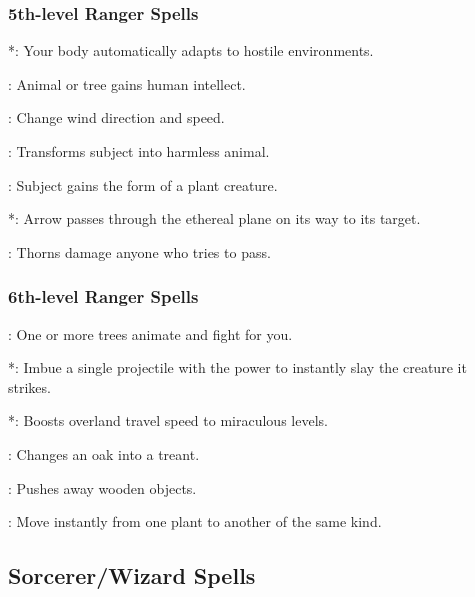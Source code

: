 \subsubsection{5th-level Ranger Spells}
\begin{list}{}{\leftmargin=1em}
\item {}*: Your body automatically adapts to hostile environments.
\item {}: Animal or tree gains human intellect.
\item {}: Change wind direction and speed.
\item {}: Transforms subject into harmless animal.
\item {}: Subject gains the form of a plant creature.
\item {}*: Arrow passes through the ethereal plane on its way to its target.
\item {}: Thorns damage anyone who tries to pass.
\end{list}
\subsubsection{6th-level Ranger Spells}
\begin{list}{}{\leftmargin=1em}
\item {}: One or more trees animate and fight for you.
\item {}*: Imbue a single projectile with the power to instantly slay the creature it strikes.
\item {}*: Boosts overland travel speed to miraculous levels.
\item {}: Changes an oak into a treant.
\item {}: Pushes away wooden objects.
\item {}: Move instantly from one plant to another of the same kind.
\end{list}
\subsection{Sorcerer/Wizard Spells}
